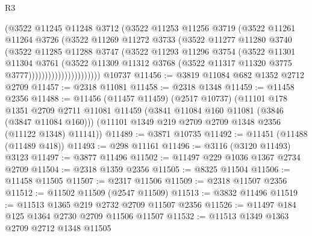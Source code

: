 \begin{lexlean}{R3}
\begin{coremodule}
                            (@3522
                              @11245
                              @11248
                              @3712
                              (@3522
                                @11253
                                @11256
                                @3719
                                (@3522
                                  @11261
                                  @11264
                                  @3726
                                  (@3522
                                    @11269
                                    @11272
                                    @3733
                                    (@3522
                                      @11277
                                      @11280
                                      @3740
                                      (@3522
                                        @11285
                                        @11288
                                        @3747
                                        (@3522
                                          @11293
                                          @11296
                                          @3754
                                          (@3522
                                            @11301
                                            @11304
                                            @3761
                                            (@3522
                                              @11309
                                              @11312
                                              @3768
                                              (@3522 @11317 @11320 @3775 @3777))))))))))))))))))))))
    @10737
@11456 := @3819 @11084 @682 @1352 @2712 @2709
@11457 := @2318 @11081
@11458 := @2318 @1348
@11459 := @11458 @2356
@11488 := @11456
    (@11457 @11459)
    (@2517 @10737)
    (@11101
      @178
      @1351
      @2709
      @2711
      @11081
      @11459
      (@3841 @11084 @160 @11081 (@3846 (@3847 @11084 @160)))
      (@11101 @1349 @219 @2709 @2709 @1348 @2356 (@11122 @1348) @11141))
@11489 := @3871 @10735
@11492 := @11451 (@11488 (@11489 @418))
@11493 := @298 @11161
@11496 := @3116 (@3120 @11493) @3123
@11497 := @3877 @11496
@11502 := @11497 @229 @1036 @1367 @2734 @2709
@11504 := @2318 @1359 @2356
@11505 := @8325 @11504
@11506 := @11458 @11505
@11507 := @2317 @11506
@11509 := @2318 @11507 @2356
@11512 := @11502 @11509 (@2547 @11509)
@11513 := @3832 @11496
@11519 := @11513 @1365 @219 @2732 @2709 @11507 @2356
@11526 := @11497 @184 @125 @1364 @2730 @2709 @11506 @11507
@11532 := @11513 @1349 @1363 @2709 @2712 @1348 @11505

\end{coremodule}
\end{lexlean}
